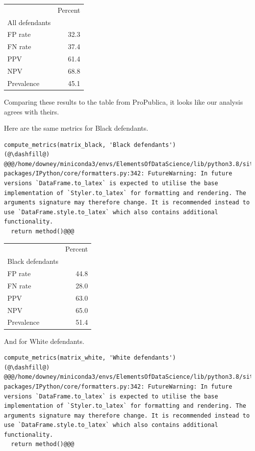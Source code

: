 \begin{tabular}{lr}
\midrule
{} &  Percent \\
All defendants &          \\
\midrule
FP rate        &     32.3 \\
FN rate        &     37.4 \\
PPV            &     61.4 \\
NPV            &     68.8 \\
Prevalence     &     45.1 \\
\midrule
\end{tabular}

Comparing these results to the table from ProPublica, it looks like our
analysis agrees with theirs.

Here are the same metrics for Black defendants.

\begin{lstlisting}[]
compute_metrics(matrix_black, 'Black defendants')
(@\dashfill@)
@@@/home/downey/miniconda3/envs/ElementsOfDataScience/lib/python3.8/site-packages/IPython/core/formatters.py:342: FutureWarning: In future versions `DataFrame.to_latex` is expected to utilise the base implementation of `Styler.to_latex` for formatting and rendering. The arguments signature may therefore change. It is recommended instead to use `DataFrame.style.to_latex` which also contains additional functionality.
  return method()@@@
\end{lstlisting}

\begin{tabular}{lr}
\midrule
{} &  Percent \\
Black defendants &          \\
\midrule
FP rate          &     44.8 \\
FN rate          &     28.0 \\
PPV              &     63.0 \\
NPV              &     65.0 \\
Prevalence       &     51.4 \\
\midrule
\end{tabular}

And for White defendants.

\begin{lstlisting}[]
compute_metrics(matrix_white, 'White defendants')
(@\dashfill@)
@@@/home/downey/miniconda3/envs/ElementsOfDataScience/lib/python3.8/site-packages/IPython/core/formatters.py:342: FutureWarning: In future versions `DataFrame.to_latex` is expected to utilise the base implementation of `Styler.to_latex` for formatting and rendering. The arguments signature may therefore change. It is recommended instead to use `DataFrame.style.to_latex` which also contains additional functionality.
  return method()@@@
\end{lstlisting}

